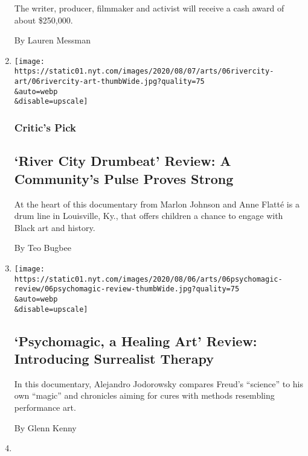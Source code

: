 \begin{enumerate}
  The writer, producer, filmmaker and activist will receive a cash award
  of about \$250,000.

  By Lauren Messman
\item
  \href{/2020/08/06/movies/river-city-drumbeat-review.html}{}

  \texttt{[image: https://static01.nyt.com/images/2020/08/07/arts/06rivercity-art/06rivercity-art-thumbWide.jpg?quality=75\\\&auto=webp\\\&disable=upscale]}

  \hypertarget{critics-pick}{%
  \subsubsection{Critic's Pick}\label{critics-pick}}

  \hypertarget{river-city-drumbeat-review-a-communitys-pulse-proves-strong}{%
  \subsection{`River City Drumbeat' Review: A Community's Pulse Proves
  Strong}\label{river-city-drumbeat-review-a-communitys-pulse-proves-strong}}

  At the heart of this documentary from Marlon Johnson and Anne Flatté
  is a drum line in Louisville, Ky., that offers children a chance to
  engage with Black art and history.

  By Teo Bugbee
\item
  \href{/2020/08/06/movies/psychomagic-a-healing-art-review.html}{}

  \texttt{[image: https://static01.nyt.com/images/2020/08/06/arts/06psychomagic-review/06psychomagic-review-thumbWide.jpg?quality=75\\\&auto=webp\\\&disable=upscale]}

  \hypertarget{psychomagic-a-healing-art-review-introducing-surrealist-therapy}{%
  \subsection{`Psychomagic, a Healing Art' Review: Introducing
  Surrealist
  Therapy}\label{psychomagic-a-healing-art-review-introducing-surrealist-therapy}}

  In this documentary, Alejandro Jodorowsky compares Freud's ``science''
  to his own ``magic'' and chronicles aiming for cures with methods
  resembling performance art.

  By Glenn Kenny
\item
  \href{/2020/08/06/movies/howard-review.html}{}


\end{enumerate}
